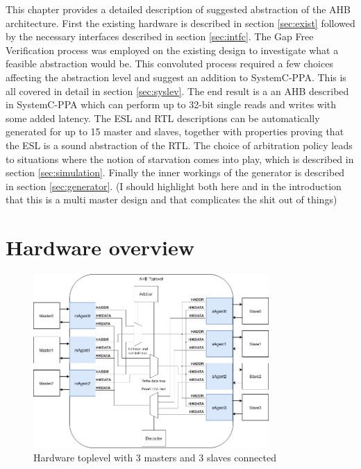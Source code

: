 \label{ch:impl}
This chapter provides a detailed description of suggested abstraction of the AHB architecture. First the existing hardware is described in section \ref{sec:exist} followed by the necessary interfaces described in section \ref{sec:intfc}. The Gap Free Verification process was employed on the existing design to investigate what a feasible abstraction would be. This convoluted process required a few choices affecting the abstraction level and suggest an addition to SystemC-PPA. This is all covered in detail in section \ref{sec:syslev}. The end result is a an AHB described in SystemC-PPA which can perform up to 32-bit single reads and writes with some added latency. The ESL and RTL descriptions can be automatically generated for up to 15 master and slaves, together with properties proving that the ESL is a sound abstraction of the RTL. The choice of arbitration policy leads to situations where the notion of starvation comes into play, which is described in section \ref{sec:simulation}. Finally the inner workings of the generator is described in section \ref{sec:generator}. (I should highlight both here and in the introduction that this is a multi master design and that complicates the shit out of things)

\newpage
\section{Hardware overview}
\label{sec:hardover}
\begin{figure}[hbt]
    \begin{center}
        \includegraphics[width=0.8\textwidth]{figs/hw/Hw_toplevel.png}
    \end{center}
    \caption{Hardware toplevel with 3 masters and 3 slaves connected}
    \label{fig:hw_toplev}
\end{figure}

